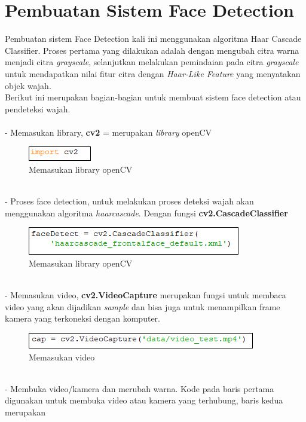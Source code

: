 \newpage
\section{Pembuatan Sistem Face Detection}
Pembuatan sistem Face Detection kali ini menggunakan algoritma Haar Cascade Classifier. Proses pertama yang dilakukan adalah dengan mengubah citra warna menjadi citra \emph{grayscale}, selanjutkan melakukan pemindaian pada citra \emph{grayscale} untuk mendapatkan nilai fitur citra dengan \emph{Haar-Like Feature} yang menyatakan objek wajah.\\

Berikut ini merupakan bagian-bagian untuk membuat sistem face detection atau pendeteksi wajah.\\
\\- Memasukan library, \textbf{cv2} = merupakan \emph{library} openCV
\begin{figure}[h!]
    \centering
    \includegraphics[width=0.3\linewidth]{images/1.PNG}
    \caption{Memasukan library openCV}
\end{figure}
\\- Proses face detection, untuk melakukan proses deteksi wajah akan menggunakan algoritma \emph{haarcascade}. Dengan fungsi \textbf{cv2.CascadeClassifier}
\begin{figure}[h!]
    \centering
    \includegraphics[width=0.7\linewidth]{images/2.PNG}
    \caption{Memasukan library openCV}
\end{figure}
\\- Memasukan video, \textbf{cv2.VideoCapture} merupakan fungsi untuk membaca video yang akan dijadikan \emph{sample} dan bisa juga untuk menampilkan frame kamera yang terkoneksi dengan komputer.
\begin{figure}[h!]
    \centering
    \includegraphics[width=0.7\linewidth]{images/3.PNG}
    \caption{Memasukan video}
\end{figure}
\\- Membuka video/kamera dan merubah warna. Kode pada baris pertama digunakan untuk membuka video atau kamera yang terhubung, baris kedua merupakan
